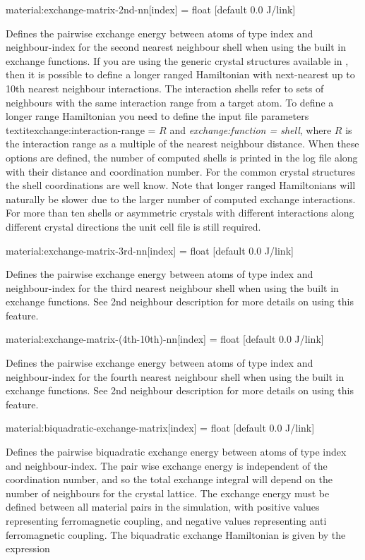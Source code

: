 {\zicf material:exchange-matrix-2nd-nn[index] = float [default 0.0 J/link]} Defines the pairwise exchange energy between atoms of type index and neighbour-index for the second nearest neighbour shell when using the built in exchange functions. If you are using the generic crystal structures available in \vampire, then it is possible to define a longer ranged Hamiltonian with next-nearest up to 10th nearest neighbour interactions. The interaction shells refer to sets of neighbours with the same interaction range from a target atom. To define a longer range Hamiltonian you need to define the input file parameters  textit{exchange:interaction-range = $R$} and \textit{exchange:function = shell}, where $R$ is the interaction range as a multiple of the nearest neighbour distance. When these options are defined, the number of computed shells is printed in the log file along with their distance and coordination number. For the common crystal structures the shell coordinations are well know. Note that longer ranged Hamiltonians will naturally be slower due to the larger number of computed exchange interactions. For more than ten shells or asymmetric crystals with different interactions
 along different crystal directions the unit cell file is still required.

{\zicf material:exchange-matrix-3rd-nn[index] = float [default 0.0 J/link]} Defines the pairwise exchange energy between atoms of type index and neighbour-index for the third nearest neighbour shell when using the built in exchange functions. See 2nd neighbour description for more details on using this feature.

{\zicf material:exchange-matrix-(4th-10th)-nn[index] = float [default 0.0 J/link]} Defines the pairwise exchange energy between atoms of type index and neighbour-index for the fourth nearest neighbour shell when using the built in exchange functions. See 2nd neighbour description for more details on using this feature.

{\zicf material:biquadratic-exchange-matrix[index] = float [default 0.0 J/link]} Defines the pairwise biquadratic exchange energy between atoms of type index and neighbour-index. The pair wise exchange energy is independent of the coordination number, and so the total exchange integral will depend on the number of neighbours for the crystal lattice. The exchange energy must be defined between all material pairs in the simulation, with positive values representing ferromagnetic coupling, and negative values representing anti ferromagnetic coupling. The biquadratic exchange Hamiltonian is given by the expression

